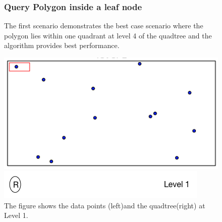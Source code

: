 \documentclass{article}
\begin{document}
\clearpage
\begin{figure}[ht]
\subsubsection{Query Polygon inside a leaf node}
The first scenario demonstrates the best case scenario where the polygon lies within one quadrant at level 4 of the quadtree and the algorithm provides best performance.


\caption{The figure shows the data points (left)and the quadtree(right) at Level 1.}
  \centering
  \begin{minipage}[b]{0.35\textwidth}
    \includegraphics[width=\textwidth]{1_1Quad1_1}  
  \end{minipage}
  \hfill
  \begin{minipage}[b]{0.5\textwidth}
    \includegraphics[width=\textwidth]{1_1Quad_1_tree}
  \end{minipage}
\end{figure}
\end{document}
